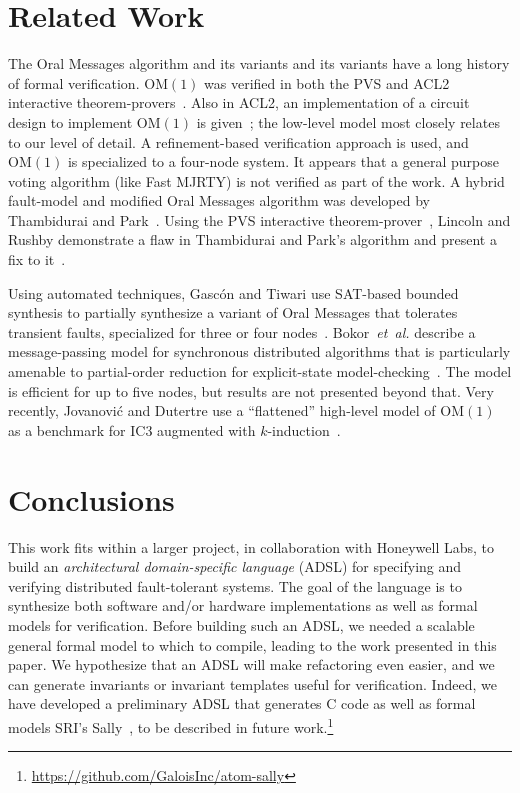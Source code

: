 \documentclass{llncs/llncs}
\newcommand{\OM}[1]{\ensuremath{\mathrm{OM}(#1)}\xspace}
\begin{document}
{%
\section{Related Work}\label{sec:related}

The Oral Messages algorithm and its variants and its variants have a long history of formal verification. \OM{1} was verified in both the PVS and ACL2 interactive theorem-provers~\cite{Young97:IC}. Also in ACL2, an implementation of a circuit design to implement \OM{1} is given~\cite{om-acl2-impl}; the low-level model most closely relates to our level of detail. A refinement-based verification approach is used, and \OM{1} is specialized to a four-node system. It appears that a general purpose voting algorithm (like Fast MJRTY) is not verified as part of the work. A hybrid fault-model and modified Oral Messages algorithm was developed by Thambidurai and Park~\cite{hybrid}. Using the PVS interactive theorem-prover~\cite{pvs}, Lincoln and Rushby demonstrate a flaw in Thambidurai and Park's algorithm and present a fix to it~\cite{Lincoln-Rushby}.

Using automated techniques, Gasc{\'{o}}n and Tiwari use SAT-based bounded synthesis to partially synthesize a variant of Oral Messages that tolerates transient faults, specialized for three or four nodes~\cite{om1-synth}. Bokor~\emph{et~al.} describe a message-passing model for synchronous distributed algorithms that is particularly amenable to partial-order reduction for explicit-state model-checking~\cite{Bokor2010}. The model is efficient for up to five nodes, but results are not presented beyond that. Very recently, Jovanovi{\'{c}} and Dutertre use a ``flattened'' high-level model of \OM{1} as a benchmark for IC3 augmented with $k$-induction~\cite{pdr-kind}.

\section{Conclusions}\label{sec:conclusions}
This work fits within a larger project, in collaboration with Honeywell Labs, to build an \emph{architectural domain-specific language} (ADSL) for specifying and verifying distributed fault-tolerant systems. The goal of the language is to synthesize both software and/or hardware implementations as well as formal models for verification. Before building such an ADSL, we needed a scalable general formal model to which to compile, leading to the work presented in this paper. We hypothesize that an ADSL will make refactoring even easier, and we can generate invariants or invariant templates useful for verification. Indeed, we have developed a preliminary ADSL that generates C code as well as formal models SRI's Sally~\cite{pdr-kind}, to be described in future work.\footnote{\url{https://github.com/GaloisInc/atom-sally}}

}
\end{document}
